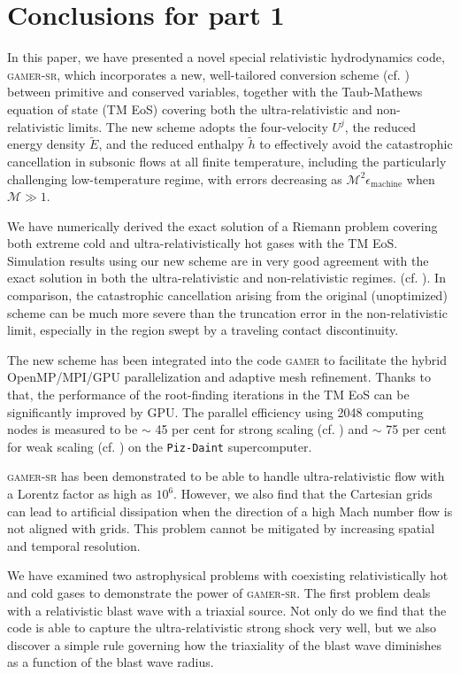 \chapter{Conclusions for part 1}
\label{c:conclusions}
 In this paper, we have presented a novel special relativistic hydrodynamics code, \textsc{gamer-sr}, which incorporates a new, well-tailored conversion scheme (cf. ) between primitive and conserved variables, together with the Taub-Mathews equation of state (TM EoS) covering both the ultra-relativistic and non-relativistic limits. The new scheme adopts the four-velocity $U^{j}$, the reduced energy density $\tilde{E}$, and the reduced enthalpy $\tilde{h}$ to effectively avoid the catastrophic cancellation in subsonic flows at all finite temperature, including the particularly challenging low-temperature regime, with errors decreasing as $\mathscr{M}^2\epsilon_{\text{machine}}$ when $\mathscr{M}\gg1$.

 We have numerically derived the exact solution of a Riemann problem covering both extreme cold and ultra-relativistically hot gases with the TM EoS. Simulation results using our new scheme are in very good agreement with the exact solution in both the ultra-relativistic and non-relativistic regimes. (cf. ). In comparison, the catastrophic cancellation arising from the original (unoptimized) scheme can be much more severe than the truncation error in the non-relativistic limit, especially in the region swept by a traveling contact discontinuity.

The new scheme has been integrated into the code \textsc{gamer} to facilitate the hybrid OpenMP/MPI/GPU parallelization and adaptive mesh refinement. Thanks to that, the performance of the root-finding iterations in the TM EoS can be significantly improved by GPU. The parallel efficiency using 2048 computing nodes is measured to be $\sim$ 45 per cent for strong scaling (cf. ) and $\sim$ 75 per cent for weak scaling (cf. ) on the \texttt{Piz-Daint} supercomputer.

\textsc{gamer-sr} has been demonstrated to be able to handle ultra-relativistic flow with a Lorentz factor as high as $10^6$. However, we also find that the Cartesian grids can lead to artificial dissipation when the direction of a high Mach number flow is not aligned with grids. This problem cannot be mitigated by increasing spatial and temporal resolution.

 We have examined two astrophysical problems with coexisting relativistically hot and cold gases to demonstrate the power of \textsc{gamer-sr}. The first problem deals with a relativistic blast wave with a triaxial source. Not only do we find that the code is able to capture the ultra-relativistic strong shock very well, but we also discover a simple rule governing how the triaxiality of the blast wave diminishes as a function of the blast wave radius.


